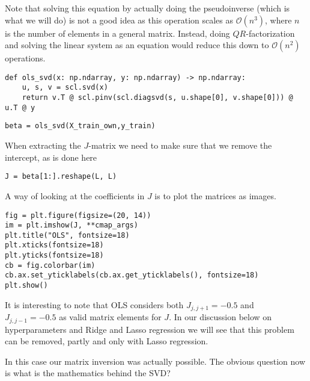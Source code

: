 \documentclass[%
oneside,                 %
final,                   %
10pt]{article}
\begin{document}
Note that solving this equation by actually doing the pseudoinverse
(which is what we will do) is not a good idea as this operation scales
as $\mathcal{O}(n^3)$, where $n$ is the number of elements in a
general matrix. Instead, doing $QR$-factorization and solving the
linear system as an equation would reduce this down to
$\mathcal{O}(n^2)$ operations.


\begin{verbatim}
def ols_svd(x: np.ndarray, y: np.ndarray) -> np.ndarray:
    u, s, v = scl.svd(x)
    return v.T @ scl.pinv(scl.diagsvd(s, u.shape[0], v.shape[0])) @ u.T @ y
\end{verbatim}

\begin{verbatim}
beta = ols_svd(X_train_own,y_train)
\end{verbatim}

When extracting the $J$-matrix  we need to make sure that we remove the intercept, as is done here

\begin{verbatim}
J = beta[1:].reshape(L, L)
\end{verbatim}

A way of looking at the coefficients in $J$ is to plot the matrices as images.


\begin{verbatim}
fig = plt.figure(figsize=(20, 14))
im = plt.imshow(J, **cmap_args)
plt.title("OLS", fontsize=18)
plt.xticks(fontsize=18)
plt.yticks(fontsize=18)
cb = fig.colorbar(im)
cb.ax.set_yticklabels(cb.ax.get_yticklabels(), fontsize=18)
plt.show()
\end{verbatim}
It is interesting to note that OLS
considers both $J_{j, j + 1} = -0.5$ and $J_{j, j - 1} = -0.5$ as
valid matrix elements for $J$.
In our discussion below on hyperparameters and Ridge and Lasso regression we will see that
this problem can be removed, partly and only with Lasso regression. 

In this case our matrix inversion was actually possible. The obvious question now is what is the mathematics behind the SVD?
\end{document}
